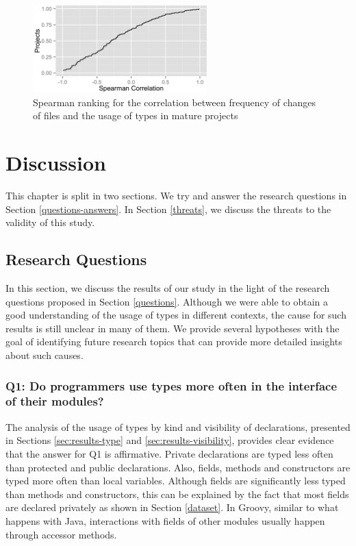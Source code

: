 \documentclass[msc]{ppgccufmg}
\begin{document}
\begin{figure}[h]
\centering \includegraphics[width=0.6\textwidth]{../aosd_2014/analysis/result/change_commits_distribution.png} 
\caption{Spearman ranking for the correlation between frequency of changes of files and the usage of types in mature projects}
\label{fig:change_spearman} 
\end{figure}
















%
%
\chapter{Discussion\label{discussion}}

This chapter is split in two sections.
We try and answer the research questions in Section \ref{questions-answers}.
In Section \ref{threats}, we discuss the threats to the validity of this study.

\section{Research Questions\label{questions-answers}}
In this section, we discuss the results of our study in the light of the research questions proposed in Section \ref{questions}.
Although we were able to obtain a good understanding of the usage of types in different contexts, the cause for such results is still unclear in many of them.
We provide several hypotheses with the goal of identifying future research topics that can provide more detailed insights about such causes.

\subsection*{Q1: Do programmers use types more often in the interface of their modules?\label{discussion-q1}}
The analysis of the usage of types by kind and visibility of declarations, presented in Sections \ref{sec:results-type} and \ref{sec:results-visibility}, provides clear evidence that the answer for Q1 is affirmative.
Private declarations are typed less often than protected and public declarations.
Also, fields, methods and constructors are typed more often than local variables.
Although fields are significantly less typed than methods and constructors, this can be explained by the fact that most fields are declared privately as shown in Section \ref{dataset}.
In Groovy, similar to what happens with Java, interactions with fields of other modules usually happen through accessor methods.
\end{document}
